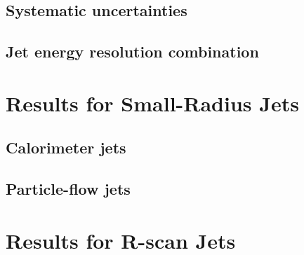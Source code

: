 \subsection{Systematic uncertainties}
\subsection{Jet energy resolution combination}
\section{Results for Small-Radius Jets}
\subsection{Calorimeter jets}
\subsection{Particle-flow jets}
\section{Results for R-scan Jets}
